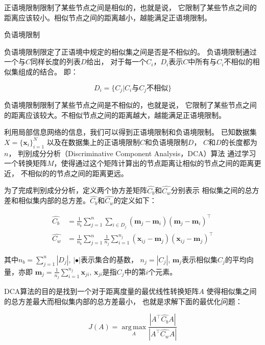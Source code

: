 正语境限制限制了某些节点之间是相似的，也就是说，
它限制了某些节点之间的距离应该较小。相似节点之间的距离越小，越能满足正语境限制。

\begin{defn}{负语境限制}
\label{defn:negconstraints}

    负语境限制限定了正语境中规定的相似集之间是否是不相似的。
    负语境限制通过一个与$C$同样长度的列表$D$给出，
    对于每一个$C_i$，$D_i$表示$C$中所有与$C_i$不相似的相似集组成的结合。
    即：

    $$
    D_i = \{C_j | C_i \text{与} C_j \text{不相似} \}
    $$

\end{defn}

负语境限制限制了某些节点之间是不相似的，也就是说，
它限制了某些节点之间的距离应该较大。不相似节点之间的距离越大，越能满足正语境限制。

利用局部信息网络的信息，我们可以得到正语境限制和负语境限制。
已知数据集
$X = \{ \bm{x}_i \}_{i=1}^{N}$
以及在数据集上的正语境限制$C$和负语境限制$D$，
$C$和$D$的长度都为$n$，
判别成分分析（Discriminative Component Analysis，DCA）算法
通过学习一个转换矩阵$M$，使得通过这个矩阵计算出的节点距离让相似的节点之间的距离更近，
不相似的的节点之间的距离更远。

为了完成判别成分分析，定义两个协方差矩阵$\hat{C_b}$和$\hat{C_w}$分别表示
相似集之间的总方差和相似集内部的总方差。$\hat{C_b}$和$\hat{C_w}$的定义如下：

\begin{align}
    \hat{C_b} &= \frac{1}{n_b} \sum_{j=1}^n \sum_{i \in D_j} (\bm{m}_j - \bm{m}_i)(\bm{m}_j - \bm{m}_i)^\top \\
    \hat{C_w} &= \frac{1}{n_b} \sum_{j=1}^n \frac{1}{n_j} \sum_{i = 1}^{n_j} (\bm{x}_{ij} - \bm{m}_j)(\bm{x}_{ij} - \bm{m}_j)^\top
\end{align}

其中$n_b = \sum_{j=1}^{n}|D_j|$, $|\bullet|$表示集合的基数，
$n_j = |C_j|$,
$\bm{m}_j$表示相似集$C_j$的平均向量，亦即
$\bm{m}_j = \frac{1}{n_j} \sum_{i=1}^{n_j} \bm{x}_{ji}$, 
$\bm{x}_{ji}$是指$C_j$中的第$i$个元素。

DCA算法的目的是找到一个对于距离度量的最优线性转换矩阵$A$
使得相似集之间的总方差最大而相似集内部的总方差最小，
也就是求解下面的最优化问题：

\begin{equation}
    \label{equa:dca_opt}
    J(A) = \operatorname*{arg\,max}_A \frac {|A^\top \hat{C_b} A|} {|A^\top \hat{C_w} A|}
\end{equation}

